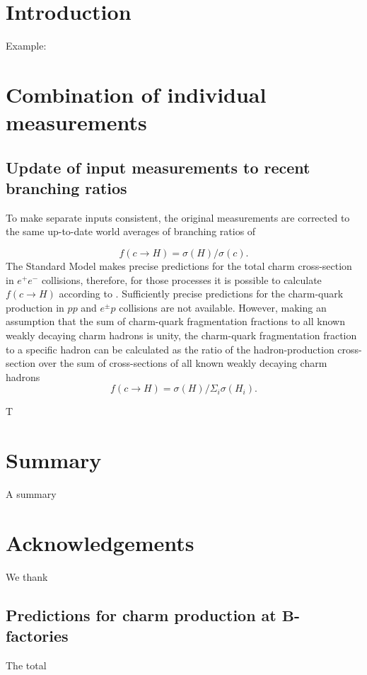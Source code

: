 \newpage
\section{Introduction}
\label{sec:int}

Example:\cite{Besson:2007aa}

\section{Combination of individual measurements}
\label{sec:comb}
\subsection{Update of input measurements to recent branching ratios}
\label{sec:pdgupdate}
To make separate inputs consistent, the original measurements are 
corrected to the same up-to-date world averages of branching ratios of 

\begin{equation}\label{eq:ffwithcharmcs}
f(c \rightarrow H) = {\sigma(H)}/{\sigma(c)}. 
\end{equation}
The Standard Model makes precise predictions for the total charm 
cross-section in $e^+e^-$ collisions, therefore, for those processes it 
is possible to calculate $f(c \rightarrow H)$ according to 
.
%
Sufficiently precise predictions for the charm-quark production 
in $pp$ and $e^{\pm}p$ collisions are not available.
%
However, making an assumption that the sum of charm-quark fragmentation 
fractions to all known weakly decaying charm hadrons is unity, the 
charm-quark fragmentation fraction to a specific hadron can be 
calculated as the ratio of the hadron-production cross-section over the 
sum of cross-sections of all known weakly decaying  charm hadrons
\begin{equation}\label{eq:ffwithsumh}
f(c\rightarrow H)={\sigma(H)}/{\Sigma_{i}\sigma(H_{i})}. 
\end{equation}

T
\section{Summary}                      
\label{sec:con}
A summary 
%
\section*{Acknowledgements}
\label{sec:ack}
We thank 
\FloatBarrier
\begin{appendices}
\section{Predictions for charm production at ${\pmb B}$-factories}
\label{sec:appendixA}
The  total  
\end{appendices}
